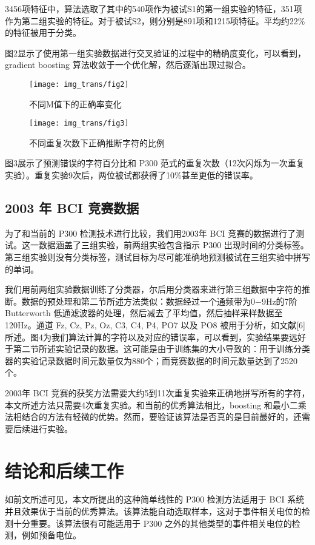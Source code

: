 \documentclass[a4paper]{ecust_thesis_translation}
\renewcommand\![1]{\immature{#1}}
\begin{document}
3456项特征中，算法选取了其中的540项作为被试S1的第一组实验的特征，351项作为第二组实验的特征。对于被试S2，则分别是891项和1215项特征。平均约22\%的特征被用于分类。

图2显示了使用第一组实验数据进行交叉验证的过程中的精确度变化，可以看到， gradient boosting 算法收敛于一个优化解，然后逐渐出现过拟合。
\begin{figure}[ht]
  \texttt{[image: img\_trans/fig2]}
  \caption{不同M值下的正确率变化}
\end{figure}

\begin{figure}[ht]
  \texttt{[image: img\_trans/fig3]}
  \caption{不同重复次数下正确推断字符的比例}
\end{figure}

图3展示了预测错误的字符百分比和 P300 范式的重复次数（12次闪烁为一次重复实验）。重复实验9次后，两位被试都获得了10\%甚至更低的错误率。

\subsection{2003 年 BCI 竞赛数据}
为了和当前的 P300 检测技术进行比较，我们用2003年 BCI 竞赛的数据进行了测试。这一数据涵盖了三组实验，前两组实验包含指示 P300 出现时间的分类标签。第三组实验则没有分类标签，测试目标为尽可能准确地预测被试在三组实验中拼写的单词。

我们用前两组实验数据训练了分类器，尔后用分类器来进行第三组数据中字符的推断。数据的预处理和第二节所述方法类似：数据经过一个通频带为0$-$9Hz的7阶 Butterworth 低通滤波器的处理，然后减去了平均值，然后抽样采样数据至120Hz。通道 Fz, Cz, Pz, Oz, C3, C4, P4, PO7 以及 PO8 被用于分析，如文献[6]所述。图4为我们算法计算的字符以及对应的错误率，可以看到，实验结果要远好于第二节所述实验记录的数据。这可能是由于训练集的大小导致的：用于训练分类器的实验记录数据时间元数量仅为880个；而竞赛数据的时间元数量达到了2520个。

2003年 BCI 竞赛的获奖方法需要大约5到11次重复实验来正确地拼写所有的字符，本文所述方法只需要4次重复实验。和当前的优秀算法相比，boosting 和最小二乘法相结合的方法有轻微的优势。然而，要验证该算法是否真的是目前最好的，还需要后续进行实验。

\section{结论和后续工作}
如前文所述可见，本文所提出的这种简单线性的 P300 检测方法适用于 BCI 系统并且效果优于当前的优秀算法。该算法能自动选取样本，这对于事件相关电位的检测十分重要。该算法很有可能适用于 P300 之外的其他类型的事件相关电位的检测，例如预备电位。
\end{document}
